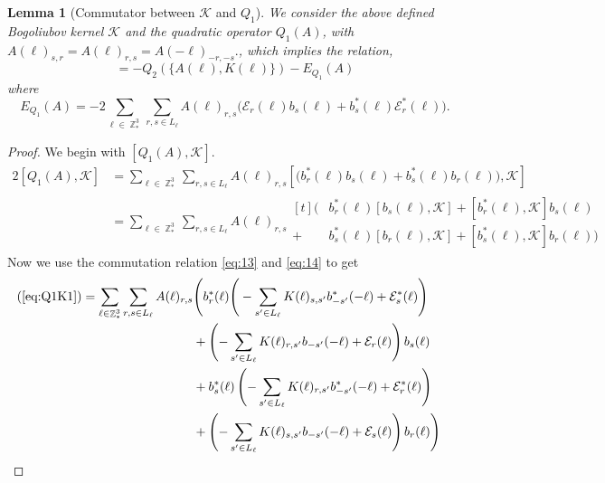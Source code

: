 \documentclass[sn-mathphys, Numbered ,a4paper]{sn-jnl}%
\DeclareMathOperator{\Z}{\mathbb{Z}}
\theoremstyle{plain}
\newtheorem{lemma}[theorem]{Lemma}
\theoremstyle{definition}
\theoremstyle{remark}
\theoremstyle{plain}
\theoremstyle{definition}
\theoremstyle{remark}
\begin{document}
\begin{lemma}[Commutator between $\mathcal{K} $ and $Q_1$]\label{lem:Q1Kcomm}
 We consider the above defined Bogoliubov kernel $\mathcal{K}$ and the quadratic operator $Q_1(A)$, with $A(\ell)_{s,r} = A(\ell)_{r,s} = A(-\ell)_{-r,-s}.$, which implies the relation,
    \begin{equation}
        [ Q_1(A),\mathcal{K}] = -Q_2(\{A(\ell),K(\ell)\}) - E_{Q_1}(A)
    \end{equation}
 where
 \begin{equation}\label{eq:errKQ1}
     E_{Q_1}(A)=- 2 \sum\limits_{\ell \in \Z^3_*}\sum\limits_{r,s \in L_{\ell}}A(\ell)_{r,s}\Big(\mathcal{E}_{r}(\ell)b_{s}(\ell) + b^*_{s}(\ell)\mathcal{E}^*_{r}(\ell)\Big). 
 \end{equation}
\end{lemma}
\begin{proof}We begin with $[ Q_1(A),\mathcal{K}]$.
    \begin{alignat}{2}
        [ Q_1(A),\mathcal{K}] &=\sum\limits_{\ell \in \Z^3_*}\sum\limits_{r,s \in L_{\ell}}A(\ell)_{r,s}\left[\Big(b^*_{r}(\ell)b_{s}(\ell) + b^*_{s}(\ell)b_{r}(\ell)\Big),\mathcal{K}\right]\nonumber\\
        &=\sum\limits_{\ell \in \Z^3_*}\sum\limits_{r,s \in L_{\ell}}A(\ell)_{r,s}\begin{aligned}[t]
            \Big(&b^*_{r}(\ell)\left[b_{s}(\ell),\mathcal{K}\right] +\left[b^*_{r}(\ell),\mathcal{K}\right]b_{s}(\ell)\\ + &b^*_{s}(\ell)\left[b_{r}(\ell),\mathcal{K}\right]+ \left[b^*_{s}(\ell),\mathcal{K}\right]b_{r}(\ell)\Big)
        \end{aligned}\label{eq:Q1K1}
    \end{alignat}
    Now we use the commutation relation \eqref{eq:13} and \eqref{eq:14} to get
\begin{alignat}{2}
    (\ref{eq:Q1K1})&=\sum\limits_{\ell \in \Z^3_*}\sum\limits_{r,s \in L_{\ell}}A(\ell)_{r,s}\begin{aligned}[t]
        &\Bigg(b^*_{r}(\ell)\Bigg(-\sum\limits_{s'\in L_{\ell}}K(\ell)_{s,s'}b^*_{-s'}(-\ell) + \mathcal{E}^*_{s}(\ell)\Bigg)\\ &+ \left(-\sum\limits_{s'\in L_{\ell}}K(\ell)_{r,s'}b_{-s'}(-\ell) + \mathcal{E}_{r}(\ell)\right)b_{s}(\ell)\\&+ b^*_{s}(\ell)\left(-\sum\limits_{s'\in L_{\ell}}K(\ell)_{r,s'}b^*_{-s'}(-\ell) + \mathcal{E}^*_{r}(\ell)\right)\\ &+ \left(-\sum\limits_{s'\in L_{\ell}}K(\ell)_{s,s'}b_{-s'}(-\ell) + \mathcal{E}_{s}(\ell)\right)b_{r}(\ell) \Bigg)        

\end{aligned}
\end{alignat}
\end{proof}
\end{document}
